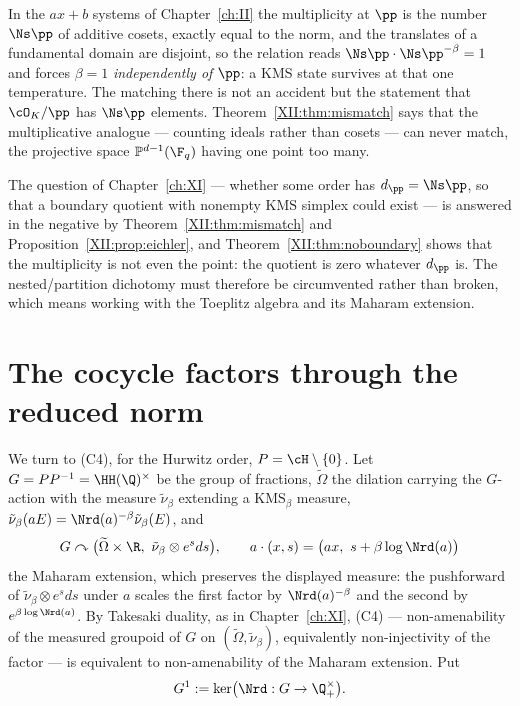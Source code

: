 \begin{remark}\label{XII:rem:affine}
In the $ax+b$ systems of Chapter~\ref{ch:II} the multiplicity at $\pp$ is the number
$\Ns\pp$ of additive cosets, exactly equal to the norm, and the translates of a fundamental
domain are disjoint, so the relation reads $\Ns\pp\cdot\Ns\pp^{-\beta}=1$ and forces $\beta=1$
\emph{independently of $\pp$}: a KMS state survives at that one temperature. The matching there is not an accident but the statement
that $\cO_K/\pp$ has $\Ns\pp$ elements. Theorem~\ref{XII:thm:mismatch} says that the
multiplicative analogue --- counting ideals rather than cosets --- can never match, the
projective space $\mathbb P^{d-1}(\F_q)$ having one point too many.
\end{remark}

\begin{corollary}\label{XII:cor:dichotomy}
The question of Chapter~\ref{ch:XI} --- whether some order has $d_\pp=\Ns\pp$, so that a boundary
quotient with nonempty $\mathrm{KMS}$ simplex could exist --- is answered in the negative by
Theorem~\ref{XII:thm:mismatch} and Proposition~\ref{XII:prop:eichler}, and Theorem~\ref{XII:thm:noboundary}
shows that the multiplicity is not even the point: the quotient is zero whatever $d_\pp$ is.
The nested/partition dichotomy must therefore be circumvented rather than broken, which
means working with the Toeplitz algebra and its Maharam extension.
\end{corollary}

\section{The cocycle factors through the reduced norm}

We turn to (C4), for the Hurwitz order, $P=\cH\setminus\{0\}$. Let $G=PP^{-1}=\HH(\Q)^\times$
be the group of fractions, $\widetilde\Omega$ the dilation carrying the $G$-action with the
measure $\tilde\nu_\beta$ extending a $\mathrm{KMS}_\beta$ measure, $\tilde\nu_\beta(aE)=\Nrd(a)^{-\beta}\tilde\nu_\beta(E)$,
and
\[
G\curvearrowright\bigl(\widetilde\Omega\times\R,\ \tilde\nu_\beta\otimes e^{s}ds\bigr),
\qquad
a\cdot(x,s)=\bigl(ax,\ s+\beta\log\Nrd(a)\bigr)
\]
the Maharam extension, which preserves the displayed measure: the pushforward of
$\tilde\nu_\beta\otimes e^sds$ under $a$ scales the first factor by $\Nrd(a)^{-\beta}$ and the
second by $e^{\beta\log\Nrd(a)}$. By Takesaki duality, as in Chapter~\ref{ch:XI}, (C4) --- non-amenability
of the measured groupoid of $G$ on $(\widetilde\Omega,\tilde\nu_\beta)$, equivalently
non-injectivity of the factor --- is equivalent to non-amenability of the Maharam extension.
Put
\[
G^1:=\ker\bigl(\Nrd:G\to\Q^\times_+\bigr).
\]

